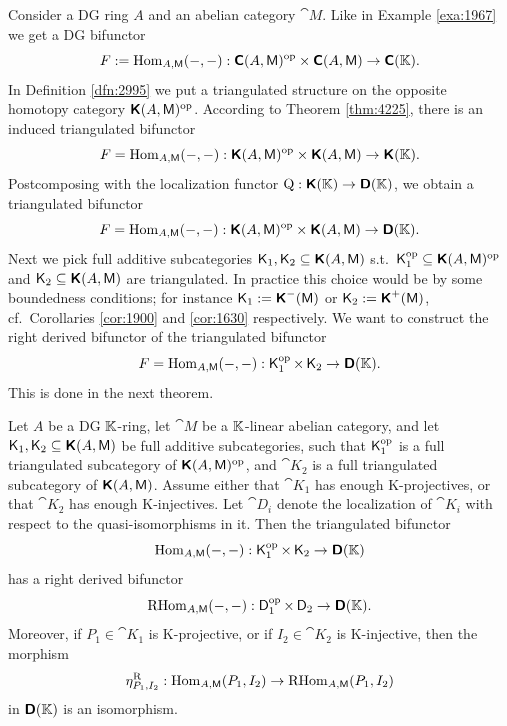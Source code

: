 Consider a DG ring $A$ and an abelian category $\cat{M}$.
Like in Example \ref{exa:1967} we get a DG bifunctor 
\[ F := \operatorname{Hom}_{A, \operatorname{\mathsf{M}}}(-, -) : \boldsymbol{\mathsf{C}}(A, \operatorname{\mathsf{M}})^{\mathrm{op}} \times
\boldsymbol{\mathsf{C}}(A, \operatorname{\mathsf{M}}) \to \boldsymbol{\mathsf{C}}(\mathbb{K}) . \]
In Definition \ref{dfn:2995} we put a triangulated structure on the opposite 
homotopy category $\boldsymbol{\mathsf{K}}(A, \operatorname{\mathsf{M}})^{\mathrm{op}}$. 
According to Theorem \ref{thm:4225}, there is an induced  
triangulated bifunctor 
\[ F = \operatorname{Hom}_{A, \operatorname{\mathsf{M}}}(-, -) : \boldsymbol{\mathsf{K}}(A, \operatorname{\mathsf{M}})^{\mathrm{op}} \times
\boldsymbol{\mathsf{K}}(A, \operatorname{\mathsf{M}}) \to \boldsymbol{\mathsf{K}}(\mathbb{K}) . \]
Postcomposing with the localization functor 
$\operatorname{Q} : \boldsymbol{\mathsf{K}}(\mathbb{K}) \to \boldsymbol{\mathsf{D}}(\mathbb{K})$, 
we obtain a triangulated bifunctor 
\[ F = \operatorname{Hom}_{A, \operatorname{\mathsf{M}}}(-, -) : \boldsymbol{\mathsf{K}}(A, \operatorname{\mathsf{M}})^{\mathrm{op}} \times
\boldsymbol{\mathsf{K}}(A, \operatorname{\mathsf{M}}) \to \boldsymbol{\mathsf{D}}(\mathbb{K}) . \]
Next we pick full additive subcategories 
$\operatorname{\mathsf{K}}_1, \operatorname{\mathsf{K}}_2 \subseteq \boldsymbol{\mathsf{K}}(A, \operatorname{\mathsf{M}})$
s.t.\ $\operatorname{\mathsf{K}}_1^{\mathrm{op}} \subseteq \boldsymbol{\mathsf{K}}(A, \operatorname{\mathsf{M}})^{\mathrm{op}}$
and
$\operatorname{\mathsf{K}}_2 \subseteq \boldsymbol{\mathsf{K}}(A, \operatorname{\mathsf{M}})$
are triangulated. In practice this choice would be by some boundedness 
conditions; for instance
$\operatorname{\mathsf{K}}_1 := \boldsymbol{\mathsf{K}}^{-}(\operatorname{\mathsf{M}})$
or $\operatorname{\mathsf{K}}_2 := \boldsymbol{\mathsf{K}}^{+}(\operatorname{\mathsf{M}})$,  
cf.\ Corollaries \ref{cor:1900} and \ref{cor:1630} respectively. 
We want to construct the right derived 
bifunctor of the triangulated bifunctor 
\[ F = \operatorname{Hom}_{A, \operatorname{\mathsf{M}}}(-, -) : \operatorname{\mathsf{K}}_1^{\mathrm{op}} \times
\operatorname{\mathsf{K}}_2 \to \boldsymbol{\mathsf{D}}(\mathbb{K}) . \]
This is done in the next theorem.

\begin{thm} \label{thm:2005}
Let $A$ be a DG $\mathbb{K}$-ring, let $\cat{M}$ be a $\mathbb{K}$-linear abelian 
category, and let $\operatorname{\mathsf{K}}_1, \operatorname{\mathsf{K}}_2 \subseteq \boldsymbol{\mathsf{K}}(A, \operatorname{\mathsf{M}})$ 
be full additive subcategories, such that $\operatorname{\mathsf{K}}_1^{\mathrm{op}}$ is a 
full triangulated subcategory of $\boldsymbol{\mathsf{K}}(A, \operatorname{\mathsf{M}})^{\mathrm{op}}$, 
and $\cat{K}_2$ is a full triangulated subcategory of 
$\boldsymbol{\mathsf{K}}(A, \operatorname{\mathsf{M}})$.
Assume either that $\cat{K}_1$ has enough K-projectives, or that $\cat{K}_2$ 
has 
enough K-injectives.
Let $\cat{D}_i$ denote the localization of $\cat{K}_i$ with respect to the 
quasi-isomorphisms in it. 
Then the triangulated bifunctor 
\[  \operatorname{Hom}_{A, \operatorname{\mathsf{M}}}(-, -) : \operatorname{\mathsf{K}}_1^{\mathrm{op}} \times
\operatorname{\mathsf{K}}_2 \to \boldsymbol{\mathsf{D}}(\mathbb{K}) \]
has a right derived bifunctor%
\[  \operatorname{RHom}_{A, \operatorname{\mathsf{M}}}(-, -) : \operatorname{\mathsf{D}}_1^{\mathrm{op}} \times
\operatorname{\mathsf{D}}_2 \to \boldsymbol{\mathsf{D}}(\mathbb{K}) . \]
Moreover, if $P_1 \in \cat{K}_1$ is K-projective, or if 
$I_2 \in \cat{K}_2$ is K-injective, then the morphism 
\[ \eta^{\mathrm{R}}_{P_1, I_2} : \operatorname{Hom}_{A, \operatorname{\mathsf{M}}}(P_1, I_2) \to 
\operatorname{RHom}_{A, \operatorname{\mathsf{M}}}(P_1, I_2) \]
in $\boldsymbol{\mathsf{D}}(\mathbb{K})$ is an isomorphism. 
\end{thm}


